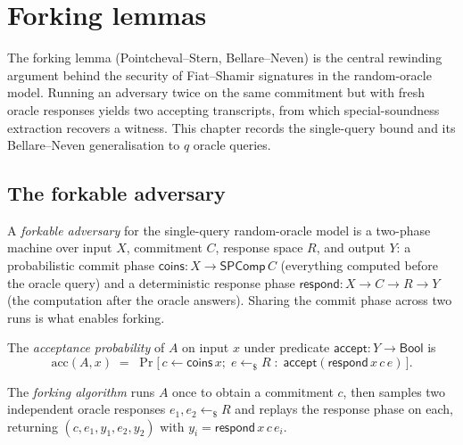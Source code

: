 \chapter{Forking lemmas}

The forking lemma (Pointcheval--Stern, Bellare--Neven) is the central rewinding
argument behind the security of Fiat--Shamir signatures in the random-oracle
model. Running an adversary twice on the same commitment but with fresh oracle
responses yields two accepting transcripts, from which special-soundness
extraction recovers a witness. This chapter records the single-query bound and
its Bellare--Neven generalisation to $q$ oracle queries.

\section{The forkable adversary}

\begin{definition}
  \label{def:forkable-adversary}
  \leanok
  A \emph{forkable adversary} for the single-query random-oracle model is a
  two-phase machine over input $X$, commitment $C$, response space $R$, and
  output $Y$: a probabilistic commit phase
  $\mathsf{coins} : X \to \mathsf{SPComp}\,C$ (everything computed before the
  oracle query) and a deterministic response phase
  $\mathsf{respond} : X \to C \to R \to Y$ (the computation after the oracle
  answers). Sharing the commit phase across two runs is what enables forking.
\end{definition}

\begin{definition}
  \label{def:fork-accept-prob}
  \leanok
  The \emph{acceptance probability} of $A$ on input $x$ under predicate
  $\mathsf{accept} : Y \to \mathsf{Bool}$ is
  \[
    \mathrm{acc}(A,x) \;=\;
    \Pr\big[\, c \leftarrow \mathsf{coins}\,x;\;
      e \leftarrow_{\$} R \;:\;
      \mathsf{accept}(\mathsf{respond}\,x\,c\,e) \,\big].
  \]
\end{definition}

\begin{definition}
  \label{def:fork-alg}
  \leanok
  The \emph{forking algorithm} runs $A$ once to obtain a commitment $c$, then
  samples two independent oracle responses $e_1, e_2 \leftarrow_{\$} R$ and
  replays the response phase on each, returning
  $(c, e_1, y_1, e_2, y_2)$ with $y_i = \mathsf{respond}\,x\,c\,e_i$.
\end{definition}

